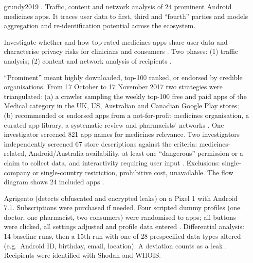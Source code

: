 \begin{papercard}{grundy2019}
    . Traffic, content and network analysis of 24 prominent Android medicines apps. It traces user data to first, third and ``fourth'' parties and models aggregation and re-identification potential across the ecosystem.

 Investigate whether and how top-rated medicines apps share user data and characterise privacy risks for clinicians and consumers . Two phases: (1) traffic analysis; (2) content and network analysis of recipients .

 ``Prominent'' meant highly downloaded, top-100 ranked, or endorsed by credible organisations. From 17 October to 17 November 2017 two strategies were triangulated: (a) a crawler sampling the weekly top-100 free and paid apps of the Medical category in the UK, US, Australian and Canadian Google Play stores; (b) recommended or endorsed apps from a not-for-profit medicines organisation, a curated app library, a systematic review and pharmacists' networks . One investigator screened 821 app names for medicines relevance. Two investigators independently screened 67 store descriptions against the criteria: medicines-related, Android/Australia availability, at least one ``dangerous'' permission or a claim to collect data, and interactivity requiring user input . Exclusions: single-company or single-country restriction, prohibitive cost, unavailable. The flow diagram shows 24 included apps .

 Agrigento (detects obfuscated and encrypted leaks) on a Pixel 1 with Android 7.1. Subscriptions were purchased if needed. Four scripted dummy profiles (one doctor, one pharmacist, two consumers) were randomised to apps; all buttons were clicked, all settings adjusted and profile data entered . Differential analysis: 14 baseline runs, then a 15th run with one of 28 prespecified data types altered (e.g.\ Android ID, birthday, email, location). A deviation counts as a leak . Recipients were identified with Shodan and WHOIS.


\end{papercard}
